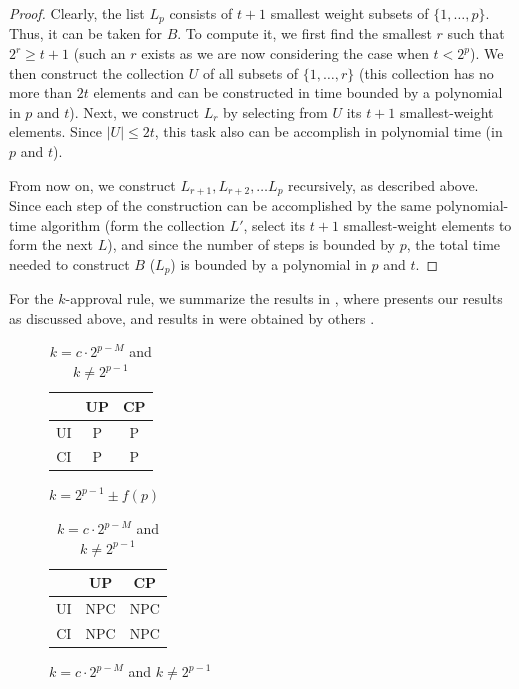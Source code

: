 \begin{proof}
Clearly, the list $L_p$ consists of $t+1$ smallest weight subsets of
$\{1,\ldots,p\}$. Thus, it can be taken for $B$. To compute it, we first
find the smallest $r$ such that $2^r\geq t+1$ (such an $r$ exists as
we are now considering the case when $t < 2^p$). We then construct the 
collection $U$ of all subsets of $\{1,\ldots, r\}$ (this collection 
has no more than $2t$ elements and can be constructed in time bounded 
by a polynomial in $p$ and $t$). Next, we construct $L_r$ by selecting 
from $U$ its $t+1$ smallest-weight elements. Since $|U|\leq 2t$, this task
also can be accomplish in polynomial time (in $p$ and $t$).

From now on, we construct $L_{r+1},L_{r+2},\ldots L_p$ recursively, as 
described above. Since each step of the construction can be accomplished
by the same polynomial-time algorithm (form the collection $L'$, select
its $t+1$ smallest-weight elements to form the next $L$), and since
the number of steps is bounded by $p$, the total time needed to construct
$B$ ($L_p$) is bounded by a polynomial in $p$ and $t$.  
\end{proof}


For the $k$-approval rule, we summarize the results in ,
where  presents our results as discussed above,
and results in  were obtained by others
\cite{lang:aggLP}.
\begin{table}
	\centering
	\caption{$k$-Approval}
  \begin{subfigure}[b]{0.5\textwidth}
		\centering
		\begin{tabular}[0.5\textwidth]{ | c | c | c | }
		  \hline
		    & UP & CP \\
		  \hline
		  UI & P & P \\
		  \hline
		  CI & P & P \\
		  \hline
		\end{tabular}
		\caption{$k=2^{p-1}\pm f(p)$}
		\label{tbl:kApp_comp_a}
	\end{subfigure}%
  \begin{subfigure}[b]{0.5\textwidth}
		\centering
		\begin{tabular}[0.5\textwidth]{ | c | c | c | }
		  \hline
		    & UP & CP \\
		  \hline
		  UI & NPC & NPC \\
		  \hline
		  CI & NPC & NPC \\
		  \hline
		\end{tabular}
		\caption{$k=c\cdot 2^{p-M}$ and $k \not = 2^{p-1}$}
		\label{tbl:kApp_comp_b}
	\end{subfigure}
	\label{tbl:kApp_comp}
\end{table}



